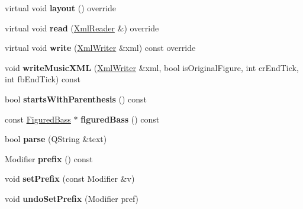 \begin{DoxyCompactItemize}
virtual void {\bfseries layout} () override
\item 
\mbox{\label{class_ms_1_1_figured_bass_item_ab4d69b5dd9e311b221e83b90753af860}} 
virtual void {\bfseries read} (\hyperlink{class_ms_1_1_xml_reader}{Xml\+Reader} \&) override
\item 
\mbox{\label{class_ms_1_1_figured_bass_item_a15d01ee139f79c92ec5b5b0eacf47de7}} 
virtual void {\bfseries write} (\hyperlink{class_ms_1_1_xml_writer}{Xml\+Writer} \&xml) const override
\item 
\mbox{\label{class_ms_1_1_figured_bass_item_aed7b2932cc02d345d871b80dc5c6c407}} 
void {\bfseries write\+Music\+X\+ML} (\hyperlink{class_ms_1_1_xml_writer}{Xml\+Writer} \&xml, bool is\+Original\+Figure, int cr\+End\+Tick, int fb\+End\+Tick) const
\item 
\mbox{\label{class_ms_1_1_figured_bass_item_acce083883653ede3e11e55cd6f19084d}} 
bool {\bfseries starts\+With\+Parenthesis} () const
\item 
\mbox{\label{class_ms_1_1_figured_bass_item_a55ccab5d0814581c4c7f266ff1eace92}} 
const \hyperlink{class_ms_1_1_figured_bass}{Figured\+Bass} $\ast$ {\bfseries figured\+Bass} () const
\item 
\mbox{\label{class_ms_1_1_figured_bass_item_af33648c5c021a9aaec17b0fe9e205e5e}} 
bool {\bfseries parse} (Q\+String \&text)
\item 
\mbox{\label{class_ms_1_1_figured_bass_item_a762569996ab9b45b480bc1383e061604}} 
Modifier {\bfseries prefix} () const
\item 
\mbox{\label{class_ms_1_1_figured_bass_item_acdbdb736781dc8c8e786c839ee4bfc4f}} 
void {\bfseries set\+Prefix} (const Modifier \&v)
\item 
\mbox{\label{class_ms_1_1_figured_bass_item_a972b5885f43e994965cca9a21a5eddc1}} 
void {\bfseries undo\+Set\+Prefix} (Modifier pref)
\item 

\end{DoxyCompactItemize}
